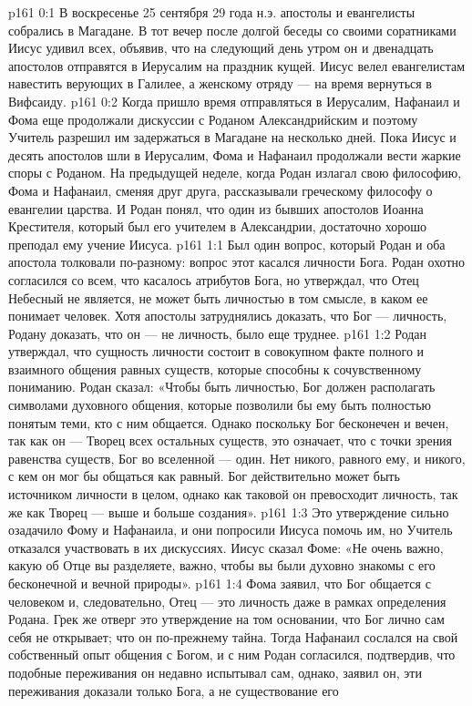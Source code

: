 \author{Комиссия срединников}
\vs p161 0:1 В воскресенье 25 сентября 29 года н.э. апостолы и евангелисты собрались в Магадане. В тот вечер после долгой беседы со своими соратниками Иисус удивил всех, объявив, что на следующий день утром он и двенадцать апостолов отправятся в Иерусалим на праздник кущей. Иисус велел евангелистам навестить верующих в Галилее, а женскому отряду --- на время вернуться в Вифсаиду.
\vs p161 0:2 Когда пришло время отправляться в Иерусалим, Нафанаил и Фома еще продолжали дискуссии с Роданом Александрийским и поэтому Учитель разрешил им задержаться в Магадане на несколько дней. Пока Иисус и десять апостолов шли в Иерусалим, Фома и Нафанаил продолжали вести жаркие споры с Роданом. На предыдущей неделе, когда Родан излагал свою философию, Фома и Нафанаил, сменяя друг друга, рассказывали греческому философу о евангелии царства. И Родан понял, что один из бывших апостолов Иоанна Крестителя, который был его учителем в Александрии, достаточно хорошо преподал ему учение Иисуса.
\vs p161 1:1 Был один вопрос, который Родан и оба апостола толковали по\hyp{}разному: вопрос этот касался личности Бога. Родан охотно согласился со всем, что касалось атрибутов Бога, но утверждал, что Отец Небесный не является, не может быть личностью в том смысле, в каком ее понимает человек. Хотя апостолы затруднялись доказать, что Бог --- личность, Родану доказать, что он --- не личность, было еще труднее.
\vs p161 1:2 Родан утверждал, что сущность личности состоит в совокупном факте полного и взаимного общения равных существ, которые способны к сочувственному пониманию. Родан сказал: «Чтобы быть личностью, Бог должен располагать символами духовного общения, которые позволили бы ему быть полностью понятым теми, кто с ним общается. Однако поскольку Бог бесконечен и вечен, так как он --- Творец всех остальных существ, это означает, что с точки зрения равенства существ, Бог во вселенной --- один. Нет никого, равного ему, и никого, с кем он мог бы общаться как равный. Бог действительно может быть источником личности в целом, однако как таковой он превосходит личность, так же как Творец --- выше и больше создания».
\vs p161 1:3 Это утверждение сильно озадачило Фому и Нафанаила, и они попросили Иисуса помочь им, но Учитель отказался участвовать в их дискуссиях. Иисус сказал Фоме: «Не очень важно, какую  об Отце вы разделяете, важно, чтобы вы были духовно знакомы с  его бесконечной и вечной природы».
\vs p161 1:4 Фома заявил, что Бог общается с человеком и, следовательно, Отец --- это личность даже в рамках определения Родана. Грек же отверг это утверждение на том основании, что Бог лично сам себя не открывает; что он по\hyp{}прежнему тайна. Тогда Нафанаил сослался на свой собственный опыт общения с Богом, и с ним Родан согласился, подтвердив, что подобные переживания он недавно испытывал сам, однако, заявил он, эти переживания доказали только  Бога, а не существование его 
